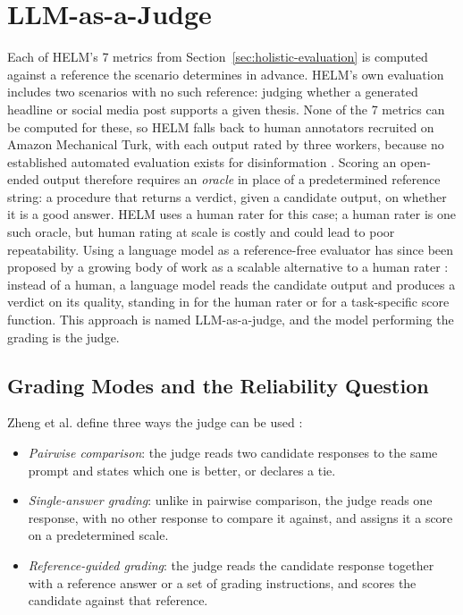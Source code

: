 \section{LLM-as-a-Judge}
\label{sec:llm-as-judge}

Each of HELM's 7 metrics from Section~\ref{sec:holistic-evaluation} is computed against a reference the scenario determines in advance. HELM's own evaluation includes two scenarios with no such reference: judging whether a generated headline or social media post supports a given thesis. None of the 7 metrics can be computed for these, so HELM falls back to human annotators recruited on Amazon Mechanical Turk, with each output rated by three workers, because no established automated evaluation exists for disinformation \cite{liangHolisticEvaluationLanguage2023}. Scoring an open-ended output therefore requires an \emph{oracle} in place of a predetermined reference string: a procedure that returns a verdict, given a candidate output, on whether it is a good answer. HELM uses a human rater for this case; a human rater is one such oracle, but human rating at scale is costly and could lead to poor repeatability. Using a language model as a reference-free evaluator has since been proposed by a growing body of work as a scalable alternative to a human rater \cite{liuGEvalNLGEvaluation2023}: instead of a human, a language model reads the candidate output and produces a verdict on its quality, standing in for the human rater or for a task-specific score function. This approach is named LLM-as-a-judge, and the model performing the grading is the judge.

\subsection{Grading Modes and the Reliability Question}
\label{sec:llm-as-judge-reliability}

Zheng et al. define three ways the judge can be used \cite{zhengJudgingLLMasaJudgeMTBench2023}:

\begin{itemize}
    \item \emph{Pairwise comparison}: the judge reads two candidate responses to the same prompt and states which one is better, or declares a tie.
    \item \emph{Single-answer grading}: unlike in pairwise comparison, the judge reads one response, with no other response to compare it against, and assigns it a score on a predetermined scale.
    \item \emph{Reference-guided grading}: the judge reads the candidate response together with a reference answer or a set of grading instructions, and scores the candidate against that reference.
\end{itemize}

